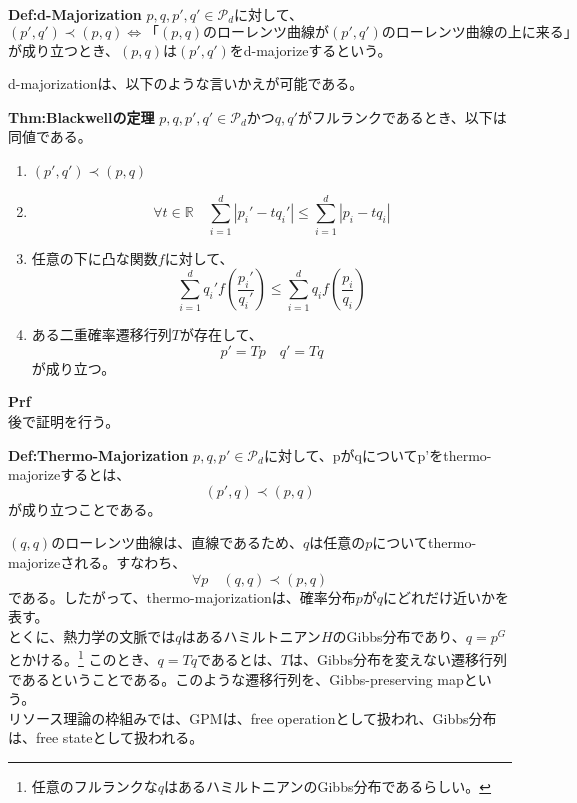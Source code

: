 \documentclass[a4paper,11pt]{jsarticle}
\numberwithin{equation}{section}
\begin{document}
\begin{itembox}[l]{\textbf{Def:d-Majorization}}
    $p,q,p',q' \in \mathcal{P}_d$に対して、
    \begin{equation}
        (p',q') \prec (p,q) \Leftrightarrow 「(p,q) \text{のローレンツ曲線が}(p',q') \text{のローレンツ曲線の上に来る」}
    \end{equation}
    が成り立つとき、$(p,q)$は$(p',q')$をd-majorizeするという。
\end{itembox}
d-majorizationは、以下のような言いかえが可能である。\\
\begin{itembox}[l]{\textbf{Thm:Blackwellの定理}}
    $p,q,p',q' \in \mathcal{P}_d$かつ$q,q'$がフルランクであるとき、以下は同値である。
    \begin{enumerate}
        \item $(p',q') \prec (p,q)$
        \item 
        \begin{equation}
            \forall t \in \mathbb{R} \quad \sum_{i=1}^{d}|p_i'-tq_i'| \leq \sum_{i=1}^{d}|p_i-tq_i|
        \end{equation}
        \item 任意の下に凸な関数$f$に対して、
        \begin{equation}
            \sum_{i=1}^{d} q_i'f(\frac{p_i'}{q_i'}) \leq \sum_{i=1}^{d} q_i f(\frac{p_i}{q_i})
        \end{equation}
        \item ある二重確率遷移行列$T$が存在して、
        \begin{equation}
            p' = Tp \quad q' = Tq
        \end{equation}
        が成り立つ。
    \end{enumerate}
\end{itembox}
\textbf{Prf}\\
後で証明を行う。\\


\begin{itembox}[l]{\textbf{Def:Thermo-Majorization}}
    $p,q,p' \in \mathcal{P}_d$に対して、pがqについてp'をthermo-majorizeするとは、
    \begin{equation}
        (p',q) \prec (p,q)
    \end{equation}
    が成り立つことである。
\end{itembox}
$(q,q)$のローレンツ曲線は、直線であるため、$q$は任意の$p$についてthermo-majorizeされる。すなわち、
\begin{equation}
    \forall p \quad (q,q) \prec (p,q)
\end{equation}
である。したがって、thermo-majorizationは、確率分布$p$が$q$にどれだけ近いかを表す。\\
とくに、熱力学の文脈では$q$はあるハミルトニアン$H$のGibbs分布であり、$q=p^G$とかける。\footnote{任意のフルランクな$q$はあるハミルトニアンのGibbs分布であるらしい。}
このとき、$q=Tq$であるとは、$T$は、Gibbs分布を変えない遷移行列であるということである。このような遷移行列を、Gibbs-preserving mapという。\\
リソース理論の枠組みでは、GPMは、free operationとして扱われ、Gibbs分布は、free stateとして扱われる。\\
\end{document}
